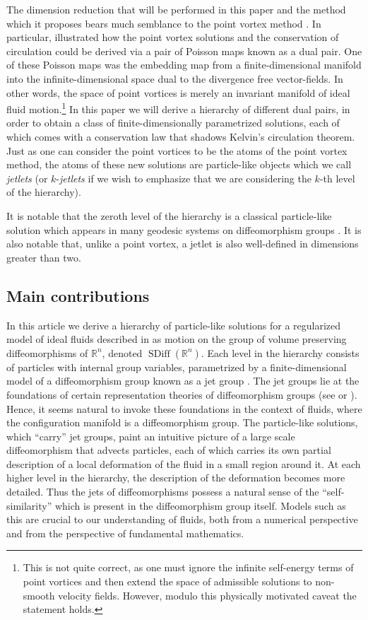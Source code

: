 \documentclass[12pt]{amsart}
\newcommand{\R}{\ensuremath{\mathbb{R}}}
\DeclareMathOperator{\SDiff}{SDiff}
\begin{document}
The dimension reduction that will be performed in this paper and the method which it proposes
bears much semblance to the point vortex method \cite{Chorin1973}.
In particular, \cite{MarsdenWeinstein1983} illustrated how the point vortex solutions and the conservation of circulation could be derived via a pair of Poisson maps known as a dual pair.
One of these Poisson maps was the embedding map from a finite-dimensional manifold into the infinite-dimensional space dual to the divergence free vector-fields.  In other words, the space of point vortices is merely an invariant manifold of ideal fluid motion.\footnote{This is not quite correct, as one must ignore the infinite self-energy terms of point vortices and then extend the space of admissible solutions to non-smooth velocity fields.  However, modulo this physically motivated caveat the statement holds.}
In this paper we will derive a hierarchy of different dual pairs, in order to obtain a class of finite-dimensionally parametrized solutions,
each of which comes with a conservation law that shadows Kelvin's circulation theorem.
Just as one can consider the point vortices to be the atoms of the point vortex method,
the atoms of these new solutions are particle-like objects which we call \emph{jetlets} (or $k$-\emph{jetlets} if we wish to emphasize that we are considering the $k$-th level of the hierarchy).

It is notable that the zeroth level of the hierarchy is a classical particle-like solution which appears in many geodesic
systems on diffeomorphism groups \cite{CamassaHolm1993,JoshiMiller2000,FringerHolm2001,MumfordMichor2013}.
It is also notable that, unlike a point vortex, a jetlet is also well-defined in dimensions greater than two.
\subsection{Main contributions}
 In this article we derive a hierarchy of particle-like
solutions for a regularized model of ideal fluids described in  \cite{MumfordMichor2013} as motion on the group of volume preserving
diffeomorphisms of $\R^n$, denoted $\SDiff(\R^n)$.
Each level in the hierarchy consists of particles
with internal group variables, parametrized by
a finite-dimensional model of a diffeomorphism group 
known as a jet group \cite[Chapter 4]{KMS99}.
The jet groups lie at the foundations of certain representation theories of diffeomorphism groups (see \cite[Appendix 2]{VershikGelfandGraev1975} or \cite{Kirillov1981}).
Hence, it seems natural to invoke these foundations in the context of fluids, where the configuration manifold is a diffeomorphism group.
The particle-like solutions, which ``carry'' jet groups, paint an intuitive picture of a large scale diffeomorphism that advects particles,
each of which carries its own partial description of a local deformation of the fluid in a small region around it.
At each higher level in the hierarchy, the description of the deformation becomes more detailed.
Thus the jets of diffeomorphisms possess a natural sense of the ``self-similarity'' which is present in the diffeomorphism group itself.
 Models such as this are crucial to our understanding of fluids,
  both from a numerical perspective and from the perspective
  of fundamental mathematics.
\end{document}
